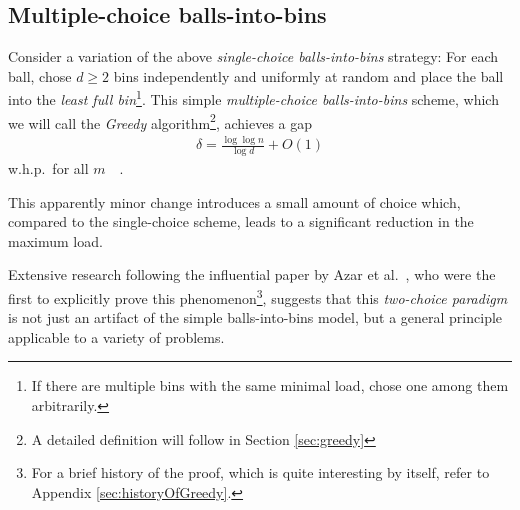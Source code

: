 \documentclass[a4paper,12pt]{article}
\begin{document}
\subsection{Multiple-choice balls-into-bins}
Consider a variation of the above \emph{single-choice balls-into-bins} strategy: For each ball, chose $d \geq 2$ bins independently and uniformly at random and place the ball into the \emph{least full bin}\footnote{If there are multiple bins with the same minimal load, chose one among them arbitrarily.}. This simple \emph{multiple-choice balls-into-bins} scheme, which we will call the \emph{Greedy} algorithm\footnote{A detailed definition will follow in Section \ref{sec:greedy}}, achieves a gap
\begin{align*}
\delta = \frac{\log \log n}{\log d} + O(1)
\end{align*}
 w.h.p.~for all $m$~\cite{ABKU99}~\cite{BCSV06}.
 
This apparently minor change introduces a small amount of choice which, compared to the single-choice scheme, leads to a significant reduction in the maximum load. 
\begin{comment}
Curiously, the exponential decrease in the gap is already achieved having just two choices (that is, $d=2$). Each additional choice decreases the bound for the maximum gap by just a constant factor~\cite{MRS01}. 
\end{comment}
Extensive research following the influential paper by Azar et al.~\cite{ABKU99}, who were the first to explicitly prove this phenomenon\footnote{For a brief history of the proof, which is quite interesting by itself, refer to Appendix \ref{sec:historyOfGreedy}.}, suggests that this \emph{two-choice paradigm} is not just an artifact of the simple balls-into-bins model, but a general principle applicable to a variety of problems. 
\end{document}

